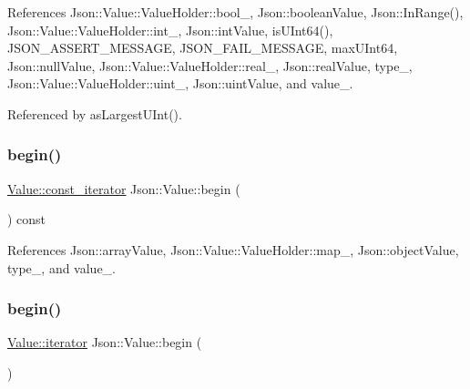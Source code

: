 References Json\+::\+Value\+::\+Value\+Holder\+::bool\+\_\+, Json\+::boolean\+Value, Json\+::\+In\+Range(), Json\+::\+Value\+::\+Value\+Holder\+::int\+\_\+, Json\+::int\+Value, is\+U\+Int64(), J\+S\+O\+N\+\_\+\+A\+S\+S\+E\+R\+T\+\_\+\+M\+E\+S\+S\+A\+GE, J\+S\+O\+N\+\_\+\+F\+A\+I\+L\+\_\+\+M\+E\+S\+S\+A\+GE, max\+U\+Int64, Json\+::null\+Value, Json\+::\+Value\+::\+Value\+Holder\+::real\+\_\+, Json\+::real\+Value, type\+\_\+, Json\+::\+Value\+::\+Value\+Holder\+::uint\+\_\+, Json\+::uint\+Value, and value\+\_\+.



Referenced by as\+Largest\+U\+Int().

\mbox{\label{classJson_1_1Value_a015459a3950c198d63a2d3be8f5ae296_a015459a3950c198d63a2d3be8f5ae296}} 
\subsubsection{\texorpdfstring{begin()}{begin()}\hspace{0.1cm}{\footnotesize\ttfamily [1/2]}}
{\footnotesize\ttfamily \hyperlink{classJson_1_1Value_af92282ca92b58b320debd486afb7696a_af92282ca92b58b320debd486afb7696a}{Value\+::const\+\_\+iterator} Json\+::\+Value\+::begin (\begin{DoxyParamCaption}{ }\end{DoxyParamCaption}) const}



References Json\+::array\+Value, Json\+::\+Value\+::\+Value\+Holder\+::map\+\_\+, Json\+::object\+Value, type\+\_\+, and value\+\_\+.

\mbox{\label{classJson_1_1Value_a2d45bb2e68e8f22fe356d7d955ebd3c9_a2d45bb2e68e8f22fe356d7d955ebd3c9}} 
\subsubsection{\texorpdfstring{begin()}{begin()}\hspace{0.1cm}{\footnotesize\ttfamily [2/2]}}
{\footnotesize\ttfamily \hyperlink{classJson_1_1Value_a341cdf2e01f8b3c5b7317aa2f0768c53_a341cdf2e01f8b3c5b7317aa2f0768c53}{Value\+::iterator} Json\+::\+Value\+::begin (\begin{DoxyParamCaption}{ }\end{DoxyParamCaption})}



